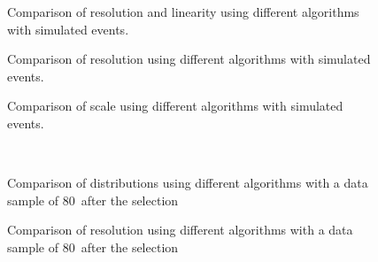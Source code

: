 \begin{figure}
\caption{Comparison of \met resolution and linearity using different \met algorithms with simulated \Wen events.} \label{fig:mc_algs_met_resolution_wenu}
\end{figure}

\begin{figure}
\caption{Comparison of \met resolution using different \met algorithms with simulated \Zmm events.} \label{fig:mc_algs_met_resolution_zmumu}
\end{figure}

\begin{figure}
\caption{Comparison of \met scale using different \met algorithms with simulated \Zmm events.} \label{fig:mc_algs_met_scale_zmumu}
\end{figure}

\begin{figure}
\caption{Comparison of \met distributions using different \met algorithms with a data sample of 80~\ipb after the \Zmm selection} \label{fig:data_algs_met_zmumu}
 \\
\end{figure}


\begin{figure}
\caption{Comparison of \met resolution using different \met algorithms with a data sample of 80~\ipb after the \Zmm selection} \label{fig:data_algs_met_resolution_zmumu}
\end{figure}
